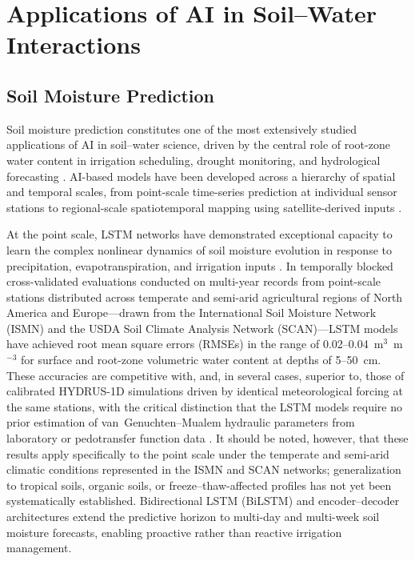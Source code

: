 \documentclass[land,review,accept,pdftex,oneauthor]{Definitions/mdpi}
\begin{document}
\section{{Applications of AI in Soil--Water Interactions}}\label{sec5}

\subsection{Soil Moisture Prediction}\label{sec5.1}

Soil moisture prediction constitutes one of the most extensively studied applications of AI in soil--water science, driven by the central role of root-zone water content in irrigation scheduling, drought monitoring, and hydrological forecasting \cite{hess2024}. AI-based models have been developed across a hierarchy of spatial and temporal scales, from point-scale time-series prediction at individual sensor stations to regional-scale spatiotemporal mapping using satellite-derived inputs \citep{Fang2017}.

At the point scale, LSTM networks have demonstrated exceptional capacity to learn the complex nonlinear dynamics of soil moisture evolution in response to precipitation, evapotranspiration, and irrigation inputs \cite{Datta}. {In temporally blocked cross-validated evaluations conducted on multi-year records from point-scale stations distributed across temperate and semi-arid agricultural regions of North America and Europe---drawn from the International Soil Moisture Network (ISMN) and the USDA Soil Climate Analysis Network (SCAN)---LSTM models have achieved root mean square errors (RMSEs) in the range of 0.02--0.04~m$^3$~m$^{-3}$ for surface and root-zone volumetric water content at depths of 5--50~cm. These accuracies are competitive with, and, in several cases, superior to, those of calibrated HYDRUS-1D simulations driven by identical meteorological forcing at the same stations, with the critical distinction that the LSTM models require no prior estimation of van~Genuchten--Mualem hydraulic parameters from laboratory or pedotransfer function data \citep{Kratzert2018}. It should be noted, however, that these results apply specifically to the point scale under the temperate and semi-arid climatic conditions represented in the ISMN and SCAN networks; generalization to tropical soils, organic soils, or freeze--thaw-affected profiles has not yet been systematically established.} Bidirectional LSTM (BiLSTM) and encoder--decoder architectures extend the predictive horizon to multi-day and multi-week soil moisture forecasts, enabling proactive rather than reactive irrigation management.
\end{document}
